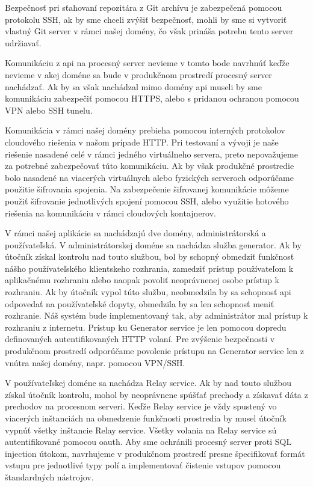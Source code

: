 Bezpečnosť pri sťahovaní repozitára z Git archívu je zabezpečená pomocou protokolu SSH, ak by sme chceli zvýšiť bezpečnosť, mohli by sme si vytvoriť vlastný Git server v rámci našej domény, čo však prináša potrebu tento server udržiavať.

Komunikáciu z \acrshort{api} na procesný server nevieme v tomto bode navrhnúť keďže nevieme v akej doméne sa bude v produkčnom prostredí procesný server nachádzať. Ak by sa však nachádzal mimo domény \acrshort{api} museli by sme komunikáciu zabezpečiť pomocou HTTPS, alebo s pridanou ochranou pomocou VPN alebo SSH tunelu.

Komunikácia v rámci našej domény prebieha pomocou interných protokolov cloudového riešenia v našom prípade HTTP.  Pri testovaní a vývoji je naše riešenie nasadené celé v rámci jedného virtuálneho servera, preto nepovažujeme za potrebné zabezpečovať túto komunikáciu. Ak by však produkčné prostredie bolo nasadené na viacerých virtuálnych alebo fyzických serveroch odporúčame použitie šifrovania spojenia. Na zabezpečenie šifrovanej komunikácie môžeme použiť šifrovanie jednotlivých spojení pomocou SSH, alebo využitie hotového riešenia na komunikáciu v rámci cloudových kontajnerov.

V rámci našej aplikácie sa nachádzajú dve domény, administrátorská a používateľská. V administrátorskej doméne sa nachádza služba generator. Ak by útočník získal kontrolu nad touto službou, bol by schopný obmedziť funkčnosť nášho používateľského klientskeho rozhrania, zamedziť prístup používateľom k aplikačnému rozhraniu alebo naopak povoliť neoprávnenej osobe prístup k rozhraniu. Ak by útočník vypol túto službu, neobmedzila by  sa schopnosť \acrshort{api} odpovedať na používateľské dopyty, obmedzila  by sa len schopnosť meniť rozhranie. Náš systém bude implementovaný tak, aby administrátor mal prístup k rozhraniu z internetu. Prístup ku Generator service je len pomocou dopredu definovaných autentifikovaných HTTP volaní. Pre zvýšenie bezpečnosti v produkčnom prostredí odporúčame povolenie prístupu na Generator service len z vnútra našej domény, napr. pomocou VPN/SSH.

V používateľskej doméne sa nachádza Relay service. Ak by nad touto službou získal útočník kontrolu, mohol by neoprávnene spúšťať prechody a získavať dáta z prechodov na procesnom serveri. Keďže Relay service je vždy spustený vo viacerých inštanciách na obmedzenie funkčnosti prostredia by musel útočník vypnúť všetky inštancie Relay service. Všetky volania na Relay service sú autentifikované pomocou \acrshort{oauth}. Aby sme ochránili procesný server proti SQL injection útokom, navrhujeme v produkčnom prostredí presne špecifikovať formát vstupu pre jednotlivé typy polí a  implementovať čistenie vstupov pomocou štandardných nástrojov.

